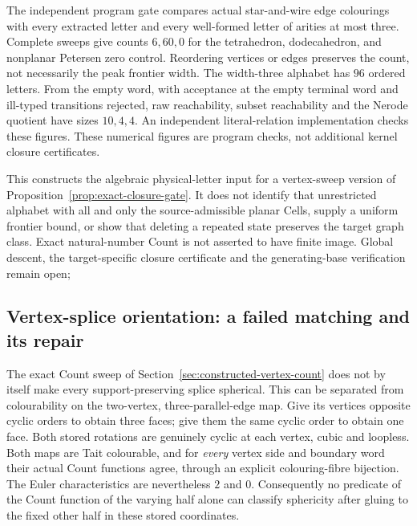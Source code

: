 The independent program gate compares actual star-and-wire edge colourings
with every extracted letter and every well-formed letter of arities at
most three. Complete sweeps give counts $6,60,0$ for the tetrahedron,
dodecahedron, and nonplanar Petersen zero control. Reordering vertices
or edges preserves the count, not necessarily the peak frontier width.
The width-three alphabet has $96$ ordered letters. From the empty word,
with acceptance at the empty terminal word and ill-typed transitions
rejected, raw reachability, subset reachability and the Nerode quotient
have sizes $10,4,4$. An independent literal-relation implementation
checks these figures. These numerical figures are program checks, not
additional kernel closure certificates.

This constructs the algebraic physical-letter input for a vertex-sweep
version of Proposition~\ref{prop:exact-closure-gate}. It does not identify
that unrestricted alphabet with all and only the source-admissible planar
Cells, supply a uniform frontier bound, or show that deleting a repeated
state preserves the target graph class. Exact natural-number Count is
not asserted to have finite image. Global descent, the target-specific
closure certificate and the generating-base verification remain open;
\subsection{Vertex-splice orientation: a failed matching and its repair}
\label{sec:vertex-splice-orientation}

The exact Count sweep of Section~\ref{sec:constructed-vertex-count} does
not by itself make every support-preserving splice spherical. This can
be separated from colourability on the two-vertex, three-parallel-edge
map. Give its vertices opposite cyclic orders to obtain three faces;
give them the same cyclic order to obtain one face. Both stored rotations
are genuinely cyclic at each vertex, cubic and loopless. Both maps are
Tait colourable, and for \emph{every} vertex side and boundary word their
actual Count functions agree, through an explicit colouring-fibre
bijection. The Euler characteristics are nevertheless $2$ and $0$.
Consequently no predicate of the Count function of the varying half alone
can classify sphericity after gluing to the fixed other half in these
stored coordinates.

